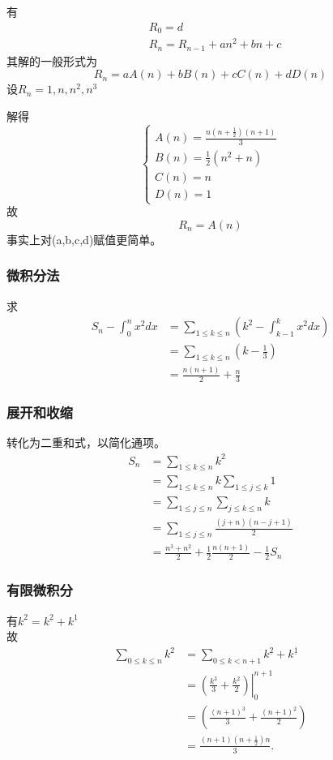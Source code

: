 \documentclass[12pt, a4paper, oneside]{ctexbook}
\begin{document}
有
$$
\begin{aligned}
&R_0=d\\
&R_n=R_{n-1}+an^2+bn+c
\end{aligned}
$$
其解的一般形式为
$$
R_n=aA(n)+bB(n)+cC(n)+dD(n)
$$
设$R_n=1,n,n^2,n^3$

解得
$$
\begin{cases}
A(n)=\frac{n(n+\frac{1}{2})(n+1)}{3}\\
B(n)=\frac{1}{2}(n^2+n)\\
C(n)=n\\
D(n)=1
\end{cases}
$$
故
$$
R_n=A(n)
$$
事实上对(a,b,c,d)赋值更简单。

\subsubsection{微积分法}

求
$$
\begin{aligned}
S_n-\int_0^nx^2 dx&=\sum_{1 \le k \le n}\left(k^2-\int_{k-1}^{k} x^2dx \right)\\
&=\sum_{1\le k \le n}(k-\frac{1}{3})\\
&=\frac{n(n+1)}{2}+\frac{n}{3}
\end{aligned}
$$

\subsubsection{展开和收缩}

转化为二重和式，以简化通项。
$$
\begin{aligned}
S_n&=\sum_{1 \le k \le n} k^2\\
&=\sum_{1 \le k \le n}k \sum_{1\le j \le k}1 \\
&=\sum_{1 \le j \le n} \sum_{j\le k \le n} k\\
&=\sum_{1 \le j \le n} \frac{(j+n)(n-j+1)}{2}\\
&=\frac{n^3+n^2}{2}+\frac{1}{2}\frac{n(n+1)}{2}- \frac{1}{2} S_n
\end{aligned}
$$

\subsubsection{有限微积分}

有$k^2=k^{\underline{2}}+k^{\underline{1}}$\\

故
$$
\begin{aligned}  
\sum_{0 \le k \le n} k^2 &= \sum_{0 \le k < n+1} k^{\underline{2}} + k^{\underline{1}} \\
&= \left. \left( \frac{k^{\underline{3}}}{3} + \frac{k^{\underline{2}}}{2} \right) \right|_{0}^{n+1} \\
&= \left( \frac{(n+1)^{\underline{3}}}{3} + \frac{(n+1)^{\underline{2}}}{2} \right) \\
&= \frac{(n+1)(n+\frac{1}{2})n}{3}.  
\end{aligned}
$$
\end{document}
